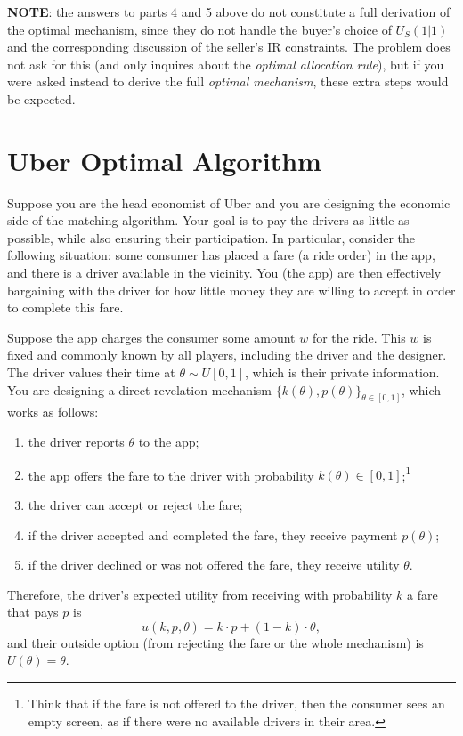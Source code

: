 \documentclass[a4paper]{article}
\begin{document}
\textbf{NOTE}: the answers to parts 4 and 5 above do not constitute a full derivation of the optimal mechanism, since they do not handle the buyer's choice of $U_S(1|1)$ and the corresponding discussion of the seller's IR constraints. The problem does not ask for this (and only inquires about the \emph{optimal allocation rule}), but if you were asked instead to derive the full \emph{optimal mechanism}, these extra steps would be expected.
\fi


	
\section{Uber Optimal Algorithm}
Suppose you are the head economist of Uber and you are designing the economic side of the matching algorithm. Your goal is to pay the drivers as little as possible, while also ensuring their participation. In particular, consider the following situation: some consumer has placed a fare (a ride order) in the app, and there is a driver available in the vicinity. You (the app) are then effectively bargaining with the driver for how little money they are willing to accept in order to complete this fare.

Suppose the app charges the consumer some amount $w$ for the ride. This $w$ is fixed and commonly known by all players, including the driver and the designer. The driver values their time at $\theta \sim U[0,1]$, which is their private information. You are designing a direct revelation mechanism $\{k(\theta),p(\theta)\}_{\theta\in[0,1]}$, which works as follows:
\begin{enumerate}[label=(\roman{enumi})]
	\item the driver reports $\theta$ to the app;
	\item the app offers the fare to the driver with probability $k(\theta) \in [0,1]$;\footnote{Think that if the fare is not offered to the driver, then the consumer sees an empty screen, as if there were no available drivers in their area.}
	\item the driver can accept or reject the fare;
	\item if the driver accepted and completed the fare, they receive payment $p(\theta)$;
	\item if the driver declined or was not offered the fare, they receive utility $\theta$.
\end{enumerate}

Therefore, the driver's expected utility from receiving with probability $k$ a fare that pays $p$ is
$$u(k,p,\theta) = k \cdot p + (1-k) \cdot \theta,$$
and their outside option (from rejecting the fare or the whole mechanism) is $\underline{U}(\theta) = \theta$.
\end{document}
